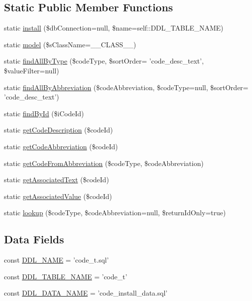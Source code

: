 \subsection*{Static Public Member Functions}
\begin{DoxyCompactItemize}
\item 
static \hyperlink{classCPSCodeTableModel_af1c9c9ff2590a2edc41d26604e237680}{install} (\$dbConnection=null, \$name=self::DDL\_\-TABLE\_\-NAME)
\item 
static \hyperlink{classCPSCodeTableModel_a269003f491b7968d7c98ae85b999448a}{model} (\$sClassName=\_\-\_\-CLASS\_\-\_\-)
\item 
static \hyperlink{classCPSCodeTableModel_a9d84f87e3545a3d7da9e454951b3601b}{findAllByType} (\$codeType, \$sortOrder= 'code\_\-desc\_\-text', \$valueFilter=null)
\item 
static \hyperlink{classCPSCodeTableModel_a74503bd0be373dc9c3beef90fe78a1f4}{findAllByAbbreviation} (\$codeAbbreviation, \$codeType=null, \$sortOrder= 'code\_\-desc\_\-text')
\item 
static \hyperlink{classCPSCodeTableModel_affb61394c9b5fb6ac5184bdcb23d0d9b}{findById} (\$iCodeId)
\item 
static \hyperlink{classCPSCodeTableModel_a2d5a3d3806d245e742305d39e19a22af}{getCodeDescription} (\$codeId)
\item 
static \hyperlink{classCPSCodeTableModel_a618b3618b665b179b0f3a5e476af2c75}{getCodeAbbreviation} (\$codeId)
\item 
static \hyperlink{classCPSCodeTableModel_a60bd91ff7b6cde62d53273e52b47ba8f}{getCodeFromAbbreviation} (\$codeType, \$codeAbbreviation)
\item 
static \hyperlink{classCPSCodeTableModel_a8e8062072f86108f6e5d902d2ce4ecee}{getAssociatedText} (\$codeId)
\item 
static \hyperlink{classCPSCodeTableModel_a66881464cd47441e18d9094bdd89949b}{getAssociatedValue} (\$codeId)
\item 
static \hyperlink{classCPSCodeTableModel_aedc330327136575b840059f1c930a153}{lookup} (\$codeType, \$codeAbbreviation=null, \$returnIdOnly=true)
\end{DoxyCompactItemize}
\subsection*{Data Fields}
\begin{DoxyCompactItemize}
\item 
const \hyperlink{classCPSCodeTableModel_a1e548fb71c67f7f778a311f3019b9ff3}{DDL\_\-NAME} = 'code\_\-t.sql'
\item 
const \hyperlink{classCPSCodeTableModel_aab7e20a5077f2a3b17ab9ae1ca8bd744}{DDL\_\-TABLE\_\-NAME} = 'code\_\-t'
\item 
const \hyperlink{classCPSCodeTableModel_ac4ef63ea01237fca6e5977e7cf0ad6fa}{DDL\_\-DATA\_\-NAME} = 'code\_\-install\_\-data.sql'
\end{DoxyCompactItemize}
